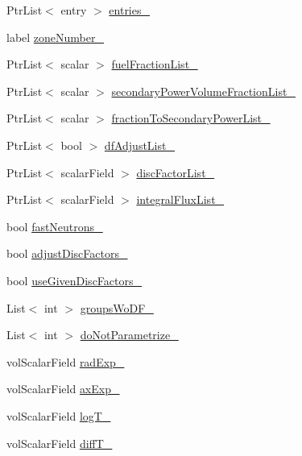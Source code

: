 \begin{DoxyCompactItemize}
Ptr\+List$<$ entry $>$ \hyperlink{classFoam_1_1XSLowMem_ae321eb5a93a161d86891d04ceba5de38}{entries\+\_\+}
\item 
label \hyperlink{classFoam_1_1XSLowMem_ada6a4a148b99570ba7b0d85af309e381}{zone\+Number\+\_\+}
\item 
Ptr\+List$<$ scalar $>$ \hyperlink{classFoam_1_1XSLowMem_a0eed7ae40daff8d8f928a816c03238dc}{fuel\+Fraction\+List\+\_\+}
\item 
Ptr\+List$<$ scalar $>$ \hyperlink{classFoam_1_1XSLowMem_a9866d718d7ff6dd34cb5932a6d7a20f4}{secondary\+Power\+Volume\+Fraction\+List\+\_\+}
\item 
Ptr\+List$<$ scalar $>$ \hyperlink{classFoam_1_1XSLowMem_af5b51be2f020a92e77d75e81656cb523}{fraction\+To\+Secondary\+Power\+List\+\_\+}
\item 
Ptr\+List$<$ bool $>$ \hyperlink{classFoam_1_1XSLowMem_aa1a72609f886403c648b883afd2324d8}{df\+Adjust\+List\+\_\+}
\item 
Ptr\+List$<$ scalar\+Field $>$ \hyperlink{classFoam_1_1XSLowMem_ac6878d1b2f43142f73523fef972e86a5}{disc\+Factor\+List\+\_\+}
\item 
Ptr\+List$<$ scalar\+Field $>$ \hyperlink{classFoam_1_1XSLowMem_ac55209828437fab67c22579de8659507}{integral\+Flux\+List\+\_\+}
\item 
bool \hyperlink{classFoam_1_1XSLowMem_ad36ef1463ce7c1bf8b5b083ad229af93}{fast\+Neutrons\+\_\+}
\item 
bool \hyperlink{classFoam_1_1XSLowMem_a995f00ddfa8d7afec0beb58f40044b8e}{adjust\+Disc\+Factors\+\_\+}
\item 
bool \hyperlink{classFoam_1_1XSLowMem_af0d46dbd8f4bf0d838e61b1a847b542a}{use\+Given\+Disc\+Factors\+\_\+}
\item 
List$<$ int $>$ \hyperlink{classFoam_1_1XSLowMem_af96c29e836fe8fbd52a58c51babc1e49}{groups\+Wo\+D\+F\+\_\+}
\item 
List$<$ int $>$ \hyperlink{classFoam_1_1XSLowMem_af530df78adddbde30f97428e0c97515a}{do\+Not\+Parametrize\+\_\+}
\item 
vol\+Scalar\+Field \hyperlink{classFoam_1_1XSLowMem_ad96049f51a96e7e9e9fec206cf446803}{rad\+Exp\+\_\+}
\item 
vol\+Scalar\+Field \hyperlink{classFoam_1_1XSLowMem_a2210015eaf4068a1b37c07abd9073cc6}{ax\+Exp\+\_\+}
\item 
vol\+Scalar\+Field \hyperlink{classFoam_1_1XSLowMem_a606ed32e8b029491812ebcea16445776}{log\+T\+\_\+}
\item 
vol\+Scalar\+Field \hyperlink{classFoam_1_1XSLowMem_a02104dbc8c61f2cc1dabadb56c722455}{diff\+T\+\_\+}

\end{DoxyCompactItemize}
